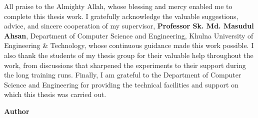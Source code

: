 
All praise to the Almighty Allah, whose blessing and mercy enabled me to
complete this thesis work. I gratefully acknowledge the valuable suggestions,
advice, and sincere cooperation of my supervisor,
\textbf{Professor Sk. Md. Masudul Ahsan}, Department of Computer Science and
Engineering, Khulna University of Engineering \& Technology, whose continuous
guidance made this work possible. I also thank the students of my thesis
group for their valuable help throughout the work, from discussions that
sharpened the experiments to their support during the long training runs.
Finally, I am grateful to the Department of Computer Science and Engineering
for providing the technical facilities and support on which this thesis was
carried out.

\vspace{2\baselineskip}
\begin{flushright}
\textbf{Author}
\end{flushright}
\clearpage
